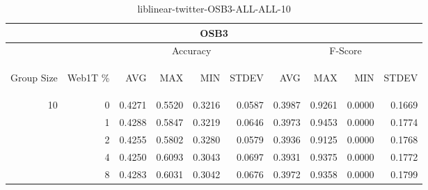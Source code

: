 \begin{center}
\begin{table}[htbp]
\begin{tabular}{ | r | r | r | r | r | r | r | r | r | r |}
\hline
\multicolumn{10}{|c|}{OSB3}\\
\hline
 & & \multicolumn{4}{|c|}{Accuracy} & \multicolumn{4}{|c|}{F-Score}\\ \cline{3-10}
\begin{sideways}Group Size\end{sideways} & \begin{sideways}Web1T \%\end{sideways} & \begin{sideways}AVG\end{sideways} & \begin{sideways}MAX\end{sideways} & \begin{sideways}MIN\end{sideways} & \begin{sideways}STDEV\end{sideways} & \begin{sideways}AVG\end{sideways} & \begin{sideways}MAX\end{sideways} & \begin{sideways}MIN\end{sideways} & \begin{sideways}STDEV\end{sideways}\\
\hline
\multirow{5}{*}{10}
 & 0 & 0.4271 & 0.5520 & 0.3216 & 0.0587 & 0.3987 & 0.9261 & 0.0000 & 0.1669\\ \cline{2-10}
 & 1 & 0.4288 & 0.5847 & 0.3219 & 0.0646 & 0.3973 & 0.9453 & 0.0000 & 0.1774\\ \cline{2-10}
 & 2 & 0.4255 & 0.5802 & 0.3280 & 0.0579 & 0.3936 & 0.9125 & 0.0000 & 0.1768\\ \cline{2-10}
 & 4 & 0.4250 & 0.6093 & 0.3043 & 0.0697 & 0.3931 & 0.9375 & 0.0000 & 0.1772\\ \cline{2-10}
 & 8 & 0.4283 & 0.6031 & 0.3042 & 0.0676 & 0.3972 & 0.9358 & 0.0000 & 0.1799\\ \cline{2-10}
\hline
\end{tabular}
\caption{liblinear-twitter-OSB3-ALL-ALL-10}
\end{table}
\end{center}

